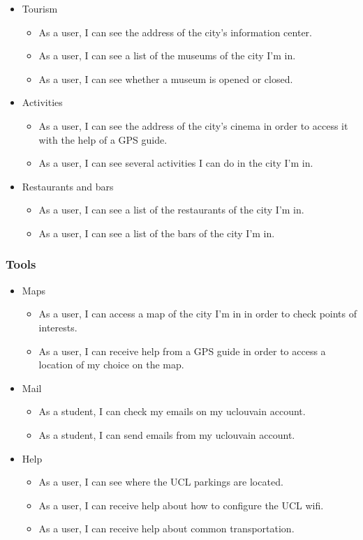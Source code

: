 \documentclass[11pt, a4paper]{report}
\begin{document}
\begin{itemize}

\item Tourism
\begin{itemize} 
\item As a user, I can see the address of the city's information center.
\item As a user, I can see a list of the museums of the city I'm in.
\item As a user, I can see whether a museum is opened or closed.
\end{itemize}

\item Activities
\begin{itemize} 
\item As a user, I can see the address of the city's cinema in order to access it with the help of a GPS guide.
\item As a user, I can see several activities I can do in the city I'm in.

\end{itemize}

\item Restaurants and bars
\begin{itemize} 
\item As a user, I can see a list of the restaurants of the city I'm in.
\item As a user, I can see a list of the bars of the city I'm in.
\end{itemize}

\end{itemize}

\subsubsection{Tools}

\begin{itemize}
\item Maps
\begin{itemize}
\item As a user, I can access a map of the city I'm in in order to check points of interests.
\item As a user, I can receive help from a GPS guide in order to access a location of my choice on the map.
\end{itemize}
\item Mail
\begin{itemize}
\item As a student, I can check my emails on my uclouvain account.
\item As a student, I can send emails from my uclouvain account.
\end{itemize}
\item{Help}
\begin{itemize}
\item As a user, I can see where the UCL parkings are located.
\item As a user, I can receive help about how to configure the UCL wifi.
\item As a user, I can receive help about common transportation.
\end{itemize}
\end{itemize}
\end{document}
